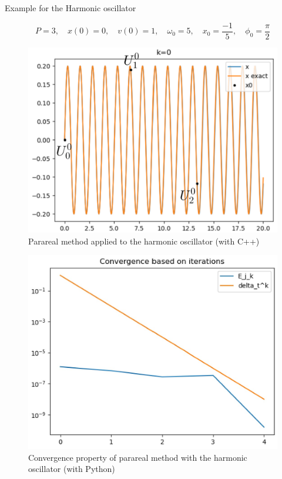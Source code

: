 \begin{frame}{Example for the Harmonic oscillator}
	
	$$P=3, \quad x(0)=0,\quad v(0)=1, \quad\omega_0=5, \quad x_0=\frac{-1}{5}, \quad \phi_0=\frac{\pi}{2}$$
	
	\begin{minipage}{0.45\linewidth}
		\begin{figure}
			\centering
			\includegraphics[width=\linewidth]{"images/parareal/osci_sol.png"}
			\caption{Parareal method applied to the harmonic oscillator (with C++)}
		\end{figure}
	\end{minipage} \; \qquad
	\begin{minipage}{0.45\linewidth}
		\begin{figure}
			\centering
			\includegraphics[width=\linewidth]{"images/parareal/osci_cvg_1.jpg"}
			\caption{Convergence property of parareal method with the harmonic oscillator (with Python)}
		\end{figure}
	\end{minipage}
	
\end{frame}

